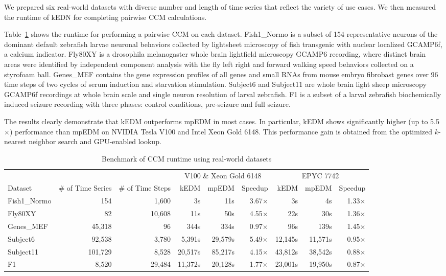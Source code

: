 \documentclass{acmart}
\begin{document}
We prepared six real-world datasets with diverse number and length of time
series that reflect the variety of use cases. We then measured the runtime of kEDN for completing pairwise CCM calculations.

Table~\ref{tbl:real-world} shows the runtime for performing a pairwise CCM on
each dataset.
Fish1\_Normo is a subset of 154 representative neurons of the dominant default zebrafish larvae neuronal behaviors collected by lightsheet microscopy of fish transgenic with nuclear localized GCAMP6f, a calcium indicator. Fly80XY is a drosophila melanogaster whole brain lightfield microscopy GCAMP6 recording, where distinct brain areas were identified by independent component analysis with the fly left right and forward walking speed behaviors collected on a styrofoam ball. Genes\_MEF contains the gene expression profiles of all genes and small RNAs from mouse embryo fibrobast genes over 96 time steps of two cycles of serum induction and starvation stimulation. Subject6 and Subject11 are whole brain light sheep microscopy GCAMP6f recordings at whole brain scale and single neuron resolution of larval zebrafish. F1 is a subset of a larval zebrafish biochemically induced seizure recording with three phases: control conditions, pre-seizure and full seizure. 

The results clearly demonstrate that kEDM outperforms mpEDM in most
cases. In particular, kEDM shows significantly higher (up to 5.5$\times$)
performance than mpEDM on NVIDIA Tesla V100 and Intel Xeon Gold 6148. 
This performance gain is obtained from the optimized $k$-nearest neighbor search and GPU-enabled lookup.

\begin{table}
\centering
\caption{Benchmark of CCM runtime using real-world datasets}%
\label{tbl:real-world}
\begin{tabular}{@{}lrrrrrrrr@{}}
\toprule
             & \multicolumn{1}{c}{} & \multicolumn{1}{c}{} & \multicolumn{3}{c}{V100 \& Xeon Gold 6148 } & \multicolumn{3}{c}{EPYC 7742} \\ \cmidrule(l){4-6}  \cmidrule(l){7-9}
Dataset      & \multicolumn{1}{c}{\# of Time Series} & \multicolumn{1}{c}{\# of Time Steps} & kEDM & mpEDM & Speedup & kEDM & mpEDM & Speedup \\ \midrule
Fish1\_Normo &  154    & 1,600  &      3s &     11s & 3.67$\times$ &      3s &      4s & 1.33$\times$ \\
Fly80XY      &  82     & 10,608 &     11s &     50s & 4.55$\times$ &     22s &     30s & 1.36$\times$ \\
Genes\_MEF   &  45,318 & 96     &    344s &    334s & 0.97$\times$ &     96s &    139s & 1.45$\times$ \\
Subject6     &  92,538 & 3,780  &  5,391s & 29,579s & 5.49$\times$ & 12,145s & 11,571s & 0.95$\times$ \\
Subject11    & 101,729 & 8,528  & 20,517s & 85,217s & 4.15$\times$ & 43,812s & 38,542s & 0.88$\times$ \\
F1           &  8,520  & 29,484 & 11,372s & 20,128s & 1.77$\times$ & 23,001s & 19,950s & 0.87$\times$ \\ \bottomrule
\end{tabular}
\end{table}
\end{document}
